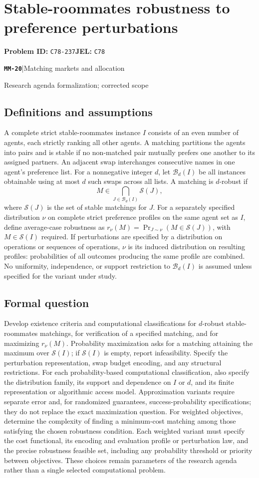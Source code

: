 \documentclass[11pt,a4paper]{article}
\newcommand{\entrymeta}[3]{{\sffamily\small\color{muted}\textbf{\texttt{#1}}\quad|\quad #2\par #3\par}}
\begin{document}
\section*{Stable-roommates robustness to preference perturbations}
\textbf{Problem ID:} \texttt{C78-237}\quad \textbf{JEL:} \texttt{C78}\par
\label{problem:OP-0561}
\label{beyond:MM-20}
\entrymeta{MM-20}{Matching markets and allocation}{Research agenda formalization; corrected scope}
\subsection*{Definitions and assumptions}
A complete strict stable-roommates instance $I$ consists of an even number of agents, each strictly ranking all other agents. A matching partitions the agents into pairs and is stable if no non-matched pair mutually prefers one another to its assigned partners. An adjacent swap interchanges consecutive names in one agent's preference list. For a nonnegative integer $d$, let $\mathcal B_d(I)$ be all instances obtainable using at most $d$ such swaps across all lists. A matching is $d$-robust if
\[
 M\in\bigcap_{J\in\mathcal B_d(I)}\mathcal S(J),
\]
where $\mathcal S(J)$ is the set of stable matchings for $J$. For a separately specified distribution $\nu$ on complete strict preference profiles on the same agent set as $I$, define average-case robustness as $r_\nu(M)=\Pr_{J\sim\nu}(M\in\mathcal S(J))$, with $M\in\mathcal S(I)$ required. If perturbations are specified by a distribution on operations or sequences of operations, $\nu$ is its induced distribution on resulting profiles: probabilities of all outcomes producing the same profile are combined. No uniformity, independence, or support restriction to $\mathcal B_d(I)$ is assumed unless specified for the variant under study.
\subsection*{Formal question}
Develop existence criteria and computational classifications for $d$-robust stable-roommates matchings, for verification of a specified matching, and for maximizing $r_\nu(M)$. Probability maximization asks for a matching attaining the maximum over $\mathcal S(I)$; if $\mathcal S(I)$ is empty, report infeasibility. Specify the perturbation representation, swap budget encoding, and any structural restrictions. For each probability-based computational classification, also specify the distribution family, its support and dependence on $I$ or $d$, and its finite representation or algorithmic access model. Approximation variants require separate error and, for randomized guarantees, success-probability specifications; they do not replace the exact maximization question. For weighted objectives, determine the complexity of finding a minimum-cost matching among those satisfying the chosen robustness condition. Each weighted variant must specify the cost functional, its encoding and evaluation profile or perturbation law, and the precise robustness feasible set, including any probability threshold or priority between objectives. These choices remain parameters of the research agenda rather than a single selected computational problem.
\end{document}
